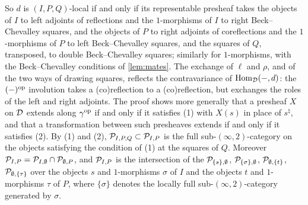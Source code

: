 %
So $d$ is $(I,P,Q)$-local if and only if its representable presheaf takes the
objects of $I$ to left adjoints of reflections and the $1$-morphisms of $I$ to
right Beck--Chevalley squares, and the objects of $P$ to right adjoints of
coreflections and the $1$-morphisms of $P$ to left Beck--Chevalley squares,
and the squares of $Q$, transposed, to double Beck--Chevalley squares;
similarly for $1$-morphisms, with the Beck--Chevalley conditions of
\cref{lem:mates}.
The exchange of $\ell$ and $\rho$, and of the two ways of drawing squares,
reflects the contravariance of $\operatorname{Hom}_{\mathcal{D}}(-,d)$:
the $ (-)^{\mathrm{op}} $ involution takes a (co)reflection to a (co)reflection,
but exchanges the roles of the left and right adjoints.
The proof shows more generally that a presheaf $X$ on $\mathcal{D}$ extends along
$\gamma^{\mathrm{op}}$ if and only if it satisfies (1) with $X(s)$ in place of
$s^{\natural}$, and that a transformation between such presheaves extends if and
only if it satisfies (2).
By (1) and (2),
$\mathcal{P}_{I,P,Q} \subset \mathcal{P}_{I,P}$
is the full sub-$(\infty,2)$-category on the objects satisfying the condition
of (1) at the squares of $Q$. Moreover
$\mathcal{P}_{I,P} = \mathcal{P}_{I,\emptyset} \cap \mathcal{P}_{\emptyset,P}$,
and $\mathcal{P}_{I,P}$ is the intersection of the
$\mathcal{P}_{\{s\},\emptyset}$,
$\mathcal{P}_{\{\sigma\},\emptyset}$,
$\mathcal{P}_{\emptyset,\{t\}}$,
$\mathcal{P}_{\emptyset,\{\tau\}}$
over the objects $s$ and $1$-morphisms $\sigma$ of $I$ and the objects $t$ and
$1$-morphisms $\tau$ of $P$, where $\{\sigma\}$ denotes the locally full
sub-$(\infty,2)$-category generated by $\sigma$.


